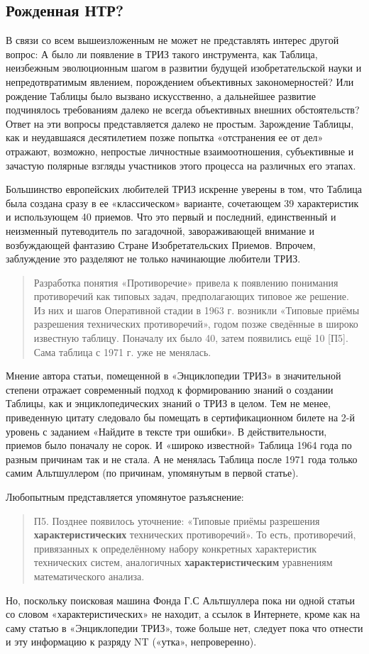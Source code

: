 \documentclass[11pt,a4paper]{article}
\begin{document}
\subsection*{Рожденная НТР?}

В связи со всем вышеизложенным не может не представлять интерес другой вопрос:
А было ли появление в ТРИЗ такого инструмента, как Таблица, неизбежным
эволюционным шагом в развитии будущей изобретательской науки и
непредотвратимым явлением, порождением объективных закономерностей? Или
рождение Таблицы было вызвано искусственно, а дальнейшее развитие подчинялось
требованиям далеко не всегда объективных внешних обстоятельств? Ответ на эти
вопросы представляется далеко не простым. Зарождение Таблицы, как и
неудавшаяся десятилетием позже попытка «отстранения ее от дел» отражают,
возможно, непростые личностные взаимоотношения, субъективные и зачастую
полярные взгляды участников этого процесса на различных его этапах.

Большинство европейских любителей ТРИЗ искренне уверены в том, что Таблица
была создана сразу в ее «классическом» варианте, сочетающем 39 характеристик и
использующем 40 приемов. Что это первый и последний, единственный и неизменный
путеводитель по загадочной, завораживающей внимание и возбуждающей фантазию
Стране Изобретательских Приемов. Впрочем, заблуждение это разделяют не только
начинающие любители ТРИЗ. 
\begin{quote}
  Разработка понятия «Противоречие» привела к появлению понимания противоречий
  как типовых задач, предполагающих типовое же решение. Из них и шагов
  Оперативной стадии в 1963 г. возникли «Типовые приёмы разрешения технических
  противоречий», годом позже сведённые в широко известную таблицу. Поначалу
  их было 40, затем появились ещё 10 [П5]. Сама таблица с 1971 г. уже не
  менялась. \cite{Korolyev1998}
\end{quote}
Мнение автора статьи, помещенной в «Энциклопедии ТРИЗ» в значительной степени
отражает современный подход к формированию знаний о создании Таблицы, как и
энциклопедических знаний о ТРИЗ в целом. Тем не менее, приведенную цитату
следовало бы помещать в сертификационном билете на 2-й уровень с заданием
«Найдите в тексте три ошибки». В действительности, приемов было поначалу не
сорок.  И «широко известной» Таблица 1964 года по разным причинам так и не
стала.  А не менялась Таблица после 1971 года только самим Альтшуллером (по
причинам, упомянутым в первой статье).

Любопытным представляется упомянутое разъяснение: 
\begin{quote}
  П5. Позднее появилось уточнение: «Типовые приёмы разрешения
  \textbf{характеристических} технических противоречий». То есть,
  противоречий, привязанных к определённому набору конкретных характеристик
  технических систем, аналогичных \textbf{характеристическим} уравнениям
  математического анализа.
\end{quote}
Но, поскольку поисковая машина Фонда Г.С Альтшуллера пока ни одной статьи со
словом «характеристических» не находит, а ссылок в Интернете, кроме как на
саму статью в «Энциклопедии ТРИЗ», тоже больше нет, следует пока что отнести и
эту информацию к разряду NT («утка», непроверенно).
\end{document}
